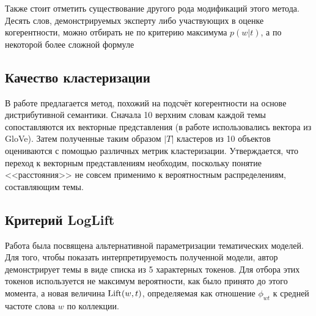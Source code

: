 Также стоит отметить существование другого рода модификаций этого метода. Десять слов, демонстрируемых эксперту либо участвующих в оценке когерентности, можно отбирать не по критерию максимума $p(w|t)$, а по некоторой более сложной формуле \cite{blei2009topic} \cite{ldavis2014}





\subsection{Качество кластеризации}

В работе \cite{krasnov19clustering} предлагается метод, похожий на подсчёт когерентности на основе дистрибутивной семантики. Сначала 10 верхним словам каждой темы сопоставляются их векторные представления (в работе использовались вектора из GloVe). Затем полученные таким образом $|T|$ кластеров из 10 объектов оцениваются с помощью различных метрик кластеризации. Утверждается, что переход к векторным представлениям необходим, поскольку понятие <<расстояния>> не совсем применимо к вероятностным распределениям, составляющим темы.


\subsection{Критерий LogLift}
Работа \cite{taddy2012estimation} была посвящена альтернативной параметризации тематических моделей. Для того, чтобы показать интерпретируемость полученной модели, автор демонстрирует темы в виде списка из 5 характерных токенов. Для отбора этих токенов используется не максимум вероятности, как было принято до этого момента, а новая величина $\textup{Lift}(w, t)$, определяемая как отношение $\phi_{wt}$ к средней частоте слова $w$ по коллекции.


